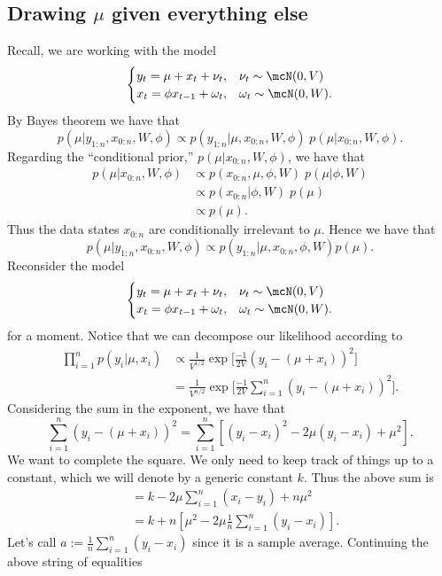 \documentclass{article}
\begin{document}
\subsection{Drawing $\mu$ given everything else}

Recall, we are working with the model
\[
\begin{cases}
y_t = \mu + x_t + \nu_t, & \nu_t \sim \mcN(0, V) \\
x_t = \phi x_{t-1} + \omega_t, & \omega_t \sim \mcN(0, W).
\end{cases}
\]
By Bayes theorem we have that
\[
p(\mu | y_{1:n}, x_{0:n}, W, \phi)
\propto
p(y_{1:n} | \mu, x_{0:n}, W, \phi) \; p(\mu | x_{0:n}, W, \phi).
\]
Regarding the ``conditional prior,'' $p(\mu | x_{0:n}, W, \phi)$, we have that
\begin{align*}
p(\mu | x_{0:n}, W, \phi) 
& \propto p(x_{0:n}, \mu, \phi, W) \; p(\mu | \phi, W) \\
& \propto p(x_{0:n} | \phi, W) \; p(\mu) \\
& \propto p(\mu).
\end{align*}
Thus the data states $x_{0:n}$ are conditionally irrelevant to $\mu$.  Hence we have that
\[
p(\mu | y_{1:n}, x_{0:n}, W, \phi) \propto
p(y_{1:n} | \mu, x_{0:n}, \phi, W) p(\mu). 
\]
Reconsider the model
\[
\begin{cases}
y_t = \mu + x_t + \nu_t, & \nu_t \sim \mcN(0, V) \\
x_t = \phi x_{t-1} + \omega_t, & \omega_t \sim \mcN(0, W).
\end{cases}
\]
for a moment.  Notice that we can decompose our likelihood according to 
\begin{align*}
\prod_{i=1}^n p(y_i | \mu, x_i) 
& \propto \frac{1}{V^{1/2}} \exp \Big[ \frac{-1}{2V} (y_i - (\mu + x_i))^2 \Big] \\
& = \frac{1}{V^{n/2}} \exp \Big[ \frac{-1}{2V} \sum_{i=1}^n (y_i - (\mu + x_i))^2 \Big].
\end{align*}
Considering the sum in the exponent, we have that
\[
\sum_{i=1}^n (y_i - (\mu + x_i))^2 = \sum_{i=1}^n [ (y_i - x_i)^2 - 2 \mu (y_i - x_i) + \mu^2].
\]
We want to complete the square.  We only need to keep track of things up to a constant, which we will denote by a generic constant $k$.  Thus the above sum is
\begin{align*}
& = k - 2 \mu \sum_{i=1}^n (x_i - y_i) + n \mu^2 \\
& = k + n [\mu^2 - 2 \mu \frac{1}{n} \sum_{i=1}^n (y_i - x_i) ].
\end{align*}
Let's call $a := \frac{1}{n} \sum_{i=1}^n (y_i - x_i)$ since it is a sample average.  Continuing the above string of equalities
\end{document}

